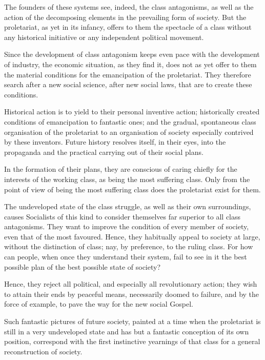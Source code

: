 The founders of these systems see, indeed, the class antagonisms, as well as the action of the decomposing elements in the prevailing form of society. But the proletariat, as yet in its infancy, offers to them the spectacle of a class without any historical initiative or any independent political movement. 

Since the development of class antagonism keeps even pace with the development of industry, the economic situation, as they find it, does not as yet offer to them the material conditions for the emancipation of the proletariat. They therefore search after a new social science, after new social laws, that are to create these conditions. 

Historical action is to yield to their personal inventive action; historically created conditions of emancipation to fantastic ones; and the gradual, spontaneous class organisation of the proletariat to an organisation of society especially contrived by these inventors. Future history resolves itself, in their eyes, into the propaganda and the practical carrying out of their social plans. 

In the formation of their plans, they are conscious of caring chiefly for the interests of the working class, as being the most suffering class. Only from the point of view of being the most suffering class does the proletariat exist for them. 

The undeveloped state of the class struggle, as well as their own surroundings, causes Socialists of this kind to consider themselves far superior to all class antagonisms. They want to improve the condition of every member of society, even that of the most favoured. Hence, they habitually appeal to society at large, without the distinction of class; nay, by preference, to the ruling class. For how can people, when once they understand their system, fail to see in it the best possible plan of the best possible state of society? 

Hence, they reject all political, and especially all revolutionary action; they wish to attain their ends by peaceful means, necessarily doomed to failure, and by the force of example, to pave the way for the new social Gospel. 

Such fantastic pictures of future society, painted at a time when the proletariat is still in a very undeveloped state and has but a fantastic conception of its own position, correspond with the first instinctive yearnings of that class for a general reconstruction of society. 

